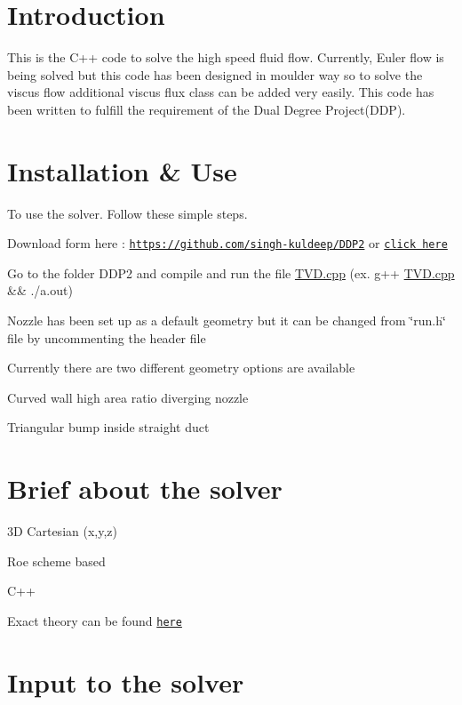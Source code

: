 \hypertarget{index_intro_sec}{}\section{Introduction}\label{index_intro_sec}
This is the C++ code to solve the high speed fluid flow. Currently, Euler flow is being solved but this code has been designed in moulder way so to solve the viscus flow additional viscus flux class can be added very easily. This code has been written to fulfill the requirement of the Dual Degree Project(\+D\+D\+P).\hypertarget{index_install_sec}{}\section{Installation \& Use}\label{index_install_sec}
To use the solver. Follow these simple steps.
\begin{DoxyItemize}
\item Download form here \+: \href{https://github.com/singh-kuldeep/DDP2}{\tt https\+://github.\+com/singh-\/kuldeep/\+D\+D\+P2} or \href{https://github.com/singh-kuldeep/DDP2}{\tt click here}
\item Go to the folder D\+D\+P2 and compile and run the file \hyperlink{TVD_8cpp}{T\+V\+D.\+cpp} (ex. g++ \hyperlink{TVD_8cpp}{T\+V\+D.\+cpp} \&\& ./a.out)
\item Nozzle has been set up as a default geometry but it can be changed from \char`\"{}run.\+h\char`\"{} file by uncommenting the header file
\item Currently there are two different geometry options are available
\begin{DoxyEnumerate}
\item Curved wall high area ratio diverging nozzle
\item Triangular bump inside straight duct
\end{DoxyEnumerate}
\end{DoxyItemize}\hypertarget{index_brief}{}\section{Brief about the solver}\label{index_brief}

\begin{DoxyItemize}
\item 3D Cartesian (x,y,z)
\item Roe scheme based
\item C++
\item Exact theory can be found \href{https://drive.google.com/open?id=0B9x_nh0D_HhzMnBjc0w5MmJpcnc}{\tt here}
\end{DoxyItemize}\hypertarget{index_input}{}\section{Input to the solver}\label{index_input}

